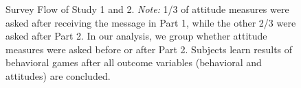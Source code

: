 \begin{figure}
{{
}
}
\caption{Survey Flow of Study 1 and 2.\label{fig:survey-flow} \textit{Note:} 1/3 of attitude measures were asked after receiving the message in Part 1, while the other 2/3 were asked after Part 2. In our analysis, we group whether attitude measures were asked before or after Part 2. Subjects learn results of behavioral games after all outcome variables (behavioral and attitudes) are concluded.}
\end{figure}